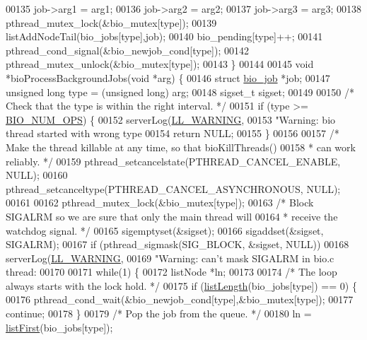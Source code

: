 \begin{DoxyCode}
00135     job->arg1 = arg1;
00136     job->arg2 = arg2;
00137     job->arg3 = arg3;
00138     pthread\_mutex\_lock(&bio\_mutex[type]);
00139     listAddNodeTail(bio\_jobs[type],job);
00140     bio\_pending[type]++;
00141     pthread\_cond\_signal(&bio\_newjob\_cond[type]);
00142     pthread\_mutex\_unlock(&bio\_mutex[type]);
00143 \}
00144 
00145 \textcolor{keywordtype}{void} *bioProcessBackgroundJobs(\textcolor{keywordtype}{void} *arg) \{
00146     \textcolor{keyword}{struct} \hyperlink{structbio__job}{bio\_job} *job;
00147     \textcolor{keywordtype}{unsigned} \textcolor{keywordtype}{long} type = (\textcolor{keywordtype}{unsigned} \textcolor{keywordtype}{long}) arg;
00148     sigset\_t sigset;
00149 
00150     \textcolor{comment}{/* Check that the type is within the right interval. */}
00151     \textcolor{keywordflow}{if} (type >= \hyperlink{bio_8h_a544b0595052937cbb10e0ffd1f56d163}{BIO\_NUM\_OPS}) \{
00152         serverLog(\hyperlink{server_8h_a31229b9334bba7d6be2a72970967a14b}{LL\_WARNING},
00153             \textcolor{stringliteral}{"Warning: bio thread started with wrong type %
00154         \textcolor{keywordflow}{return} NULL;
00155     \}
00156 
00157     \textcolor{comment}{/* Make the thread killable at any time, so that bioKillThreads()}
00158 \textcolor{comment}{     * can work reliably. */}
00159     pthread\_setcancelstate(PTHREAD\_CANCEL\_ENABLE, NULL);
00160     pthread\_setcanceltype(PTHREAD\_CANCEL\_ASYNCHRONOUS, NULL);
00161 
00162     pthread\_mutex\_lock(&bio\_mutex[type]);
00163     \textcolor{comment}{/* Block SIGALRM so we are sure that only the main thread will}
00164 \textcolor{comment}{     * receive the watchdog signal. */}
00165     sigemptyset(&sigset);
00166     sigaddset(&sigset, SIGALRM);
00167     \textcolor{keywordflow}{if} (pthread\_sigmask(SIG\_BLOCK, &sigset, NULL))
00168         serverLog(\hyperlink{server_8h_a31229b9334bba7d6be2a72970967a14b}{LL\_WARNING},
00169             \textcolor{stringliteral}{"Warning: can't mask SIGALRM in bio.c thread: %
00170 
00171     \textcolor{keywordflow}{while}(1) \{
00172         listNode *ln;
00173 
00174         \textcolor{comment}{/* The loop always starts with the lock hold. */}
00175         \textcolor{keywordflow}{if} (\hyperlink{adlist_8h_afde0ab079f934670e82119b43120e94b}{listLength}(bio\_jobs[type]) == 0) \{
00176             pthread\_cond\_wait(&bio\_newjob\_cond[type],&bio\_mutex[type]);
00177             \textcolor{keywordflow}{continue};
00178         \}
00179         \textcolor{comment}{/* Pop the job from the queue. */}
00180         ln = \hyperlink{adlist_8h_aa8dc514bbe217bb2e87c1c77cfa84690}{listFirst}(bio\_jobs[type]);
}}
\end{DoxyCode}
